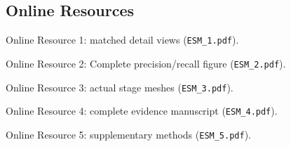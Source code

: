 \documentclass[11pt,a4paper]{article}
\begin{document}
\subsection*{Online Resources}
Online Resource 1: matched detail views (\texttt{ESM\_1.pdf}).

Online Resource 2: Complete precision/recall figure (\texttt{ESM\_2.pdf}).

Online Resource 3: actual stage meshes (\texttt{ESM\_3.pdf}).

Online Resource 4: complete evidence manuscript (\texttt{ESM\_4.pdf}).

Online Resource 5: supplementary methods (\texttt{ESM\_5.pdf}).
\end{document}

